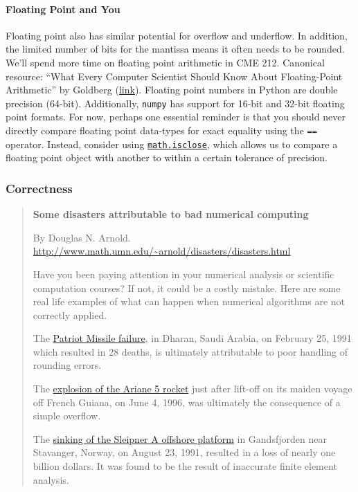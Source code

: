\documentclass[12pt,letterpaper,twoside]{article}
\begin{document}
\paragraph{Floating Point and You}
Floating point also has similar potential for overflow and underflow.
In addition, the limited number of bits for the mantissa means it
often needs to be rounded.
We'll spend more time on floating point arithmetic in CME 212.
Canonical resource: ``What Every Computer Scientist Should Know About
Floating-Point Arithmetic'' by Goldberg
(\href{https://ece.uwaterloo.ca/~dwharder/NumericalAnalysis/02Numerics/Double/paper.pdf}{link}).
Floating point numbers in Python are double precision (64-bit).
Additionally, \texttt{numpy} has support for 16-bit and 32-bit
floating point formats.
For now, perhaps one essential reminder is that you should never
directly compare floating point data-types for exact equality using
the \texttt{==} operator. Instead, consider using
\href{https://docs.python.org/3/library/math.html#math.isclose}{\texttt{math.isclose}},
which allows us to compare a floating point object with another to
within a certain tolerance of precision.

\vspace{-2ex}
\subsubsection{Correctness}

{
  \small
\begin{quote}
\textbf{Some disasters attributable to bad numerical computing}

By Douglas N. Arnold.
{\footnotesize \url{http://www.math.umn.edu/~arnold/disasters/disasters.html}}

Have you been paying attention in your numerical analysis or scientific
computation courses? If not, it could be a costly mistake. Here are some
real life examples of what can happen when numerical algorithms are not
correctly applied.

The
\href{http://www-users.math.umn.edu/~arnold/disasters/patriot.html}{Patriot
  Missile failure},
in Dharan, Saudi Arabia, on February 25,
1991 which resulted in 28 deaths, is ultimately attributable to poor
handling of rounding errors.

The \href{http://www-users.math.umn.edu/~arnold/disasters/ariane.html}{explosion of the Ariane 5 rocket} just after lift-off on its maiden
voyage off French Guiana, on June 4, 1996, was ultimately the
consequence of a simple overflow.

The
\href{http://www-users.math.umn.edu/~arnold/disasters/sleipner.html}{sinking
  of the Sleipner A offshore platform}
in Gandsfjorden near
Stavanger, Norway, on August 23, 1991, resulted in a loss of nearly one
billion dollars. It was found to be the result of inaccurate finite
element analysis.
\end{quote}
}
\end{document}

